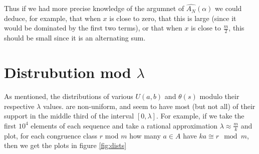 \documentclass{report}
\theoremstyle{remark}
\numberwithin{equation}{section}
\begin{document}
Thus if we had more precise knowledge of the argumnet of
$\widehat{A_N}(\alpha)$ we could deduce, for example, that when $x$ is
close to zero, that this is large (since it would be dominated by the
first two terms), or that when $x$ is close to $\frac{m}{2}$, this
should be small since it is an alternating sum.

\section{Distrubution mod $\lambda$}

As mentioned, the distributions of various $U(a,b)$ and $\theta(s)$
modulo their respective $\lambda$ values. are non-uniform, and seem to
have most (but not all) of their support in the middle third of the
interval $[0,\lambda]$.  For example, if we take the first $10^4$
elements of each sequence and take a rational approximation
$\lambda \approx \frac{m}{k}$ and plot, for each congruence class $r$
mod $m$ how many $a \in A$ have $ka \cong r \mod{m}$, then we get the
plots in figure \ref{fig:dists}
\end{document}
